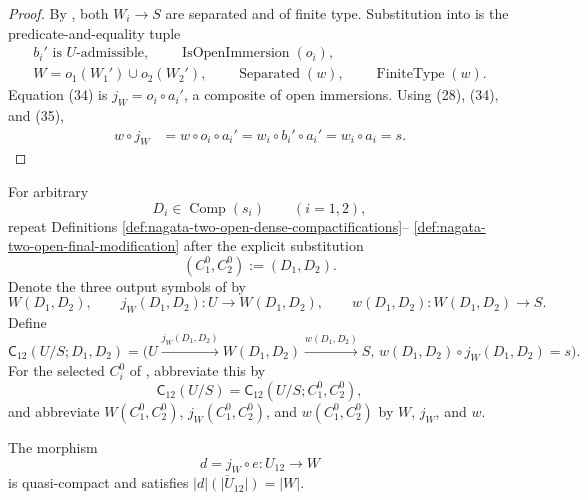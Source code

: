 \begin{proof}
  By , both $W_i\to S$ are
  separated and of finite type.  Substitution into
   is the predicate-and-equality tuple
  \[
  \begin{gathered}
    b_i'\text{ is }U\text{-admissible},\qquad
    \operatorname{IsOpenImmersion}(o_i),\\
    W=o_1(W_1')\cup o_2(W_2'),\qquad
    \operatorname{Separated}(w),\qquad
    \operatorname{FiniteType}(w).
  \end{gathered}
  \]
  Equation (34) is $j_W=o_i\circ a_i'$, a composite of open immersions.
  Using (28), (34), and (35),
  \[
  \begin{aligned}
    w\circ j_W
      &=w\circ o_i\circ a_i'
       =w_i\circ b_i'\circ a_i'
       =w_i\circ a_i
       =s.
  \end{aligned}
  \]
\end{proof}

\begin{definition}
  \label{def:nagata-two-open-compactification-candidate}
  \lean{}

  For arbitrary
  \[
    D_i\in\operatorname{Comp}(s_i)\qquad(i=1,2),
  \]
  repeat Definitions
  \ref{def:nagata-two-open-dense-compactifications}--
  \ref{def:nagata-two-open-final-modification} after the explicit
  substitution
  \[
    (C_1^0,C_2^0):=(D_1,D_2).
  \]
  Denote the three output symbols of
   by
  \[
    W(D_1,D_2),\qquad
    j_W(D_1,D_2)\colon U\to W(D_1,D_2),\qquad
    w(D_1,D_2)\colon W(D_1,D_2)\to S.
  \]
  Define
  \[
    \mathsf C_{12}(U/S;D_1,D_2)
      =
      \bigl(
        U\xrightarrow{j_W(D_1,D_2)}W(D_1,D_2)
          \xrightarrow{w(D_1,D_2)}S,\,
        w(D_1,D_2)\circ j_W(D_1,D_2)=s
      \bigr).
  \]
  For the selected $C_i^0$ of
  , abbreviate this by
  \[
    \mathsf C_{12}(U/S)
      =\mathsf C_{12}(U/S;C_1^0,C_2^0),
  \]
  and abbreviate $W(C_1^0,C_2^0)$, $j_W(C_1^0,C_2^0)$, and
  $w(C_1^0,C_2^0)$ by $W$, $j_W$, and $w$.
\end{definition}

\begin{lemma}
  \label{lemma:nagata-final-density}
  \lean{}

  The morphism
  \[
    d=j_W\circ e\colon U_{12}\to W
  \]
  is quasi-compact and satisfies
  $\overline{|d|(|U_{12}|)}=|W|$.
\end{lemma}

